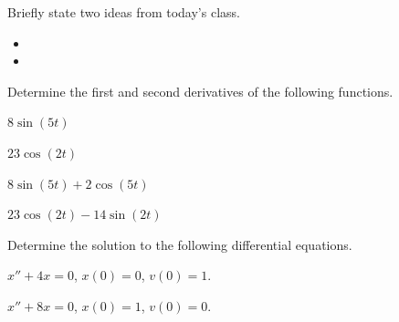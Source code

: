 \postClass

\begin{problem}
\item Briefly state two ideas from today's class.
  \begin{itemize}
  \item 
  \item 
  \end{itemize}
\item Determine the first and second derivatives of the following functions.
  \begin{subproblem}
  \item $8\sin(5t)$
    \vfill
  \item $23\cos(2t)$
    \vfill
  \item $8\sin(5t)+2\cos(5t)$
    \vfill
  \item $23\cos(2t)-14\sin(2t)$
    \vfill
  \end{subproblem}
\end{problem}


\begin{problem}
\item Determine the solution to the following differential equations.
  \begin{subproblem}
  \item $x'' + 4 x  =  0$, $x(0)=0$, $v(0)=1$.
    \vfill
  \item $x'' + 8 x  =  0$, $x(0)=1$, $v(0)=0$.
    \vfill
  \end{subproblem}
\end{problem}


